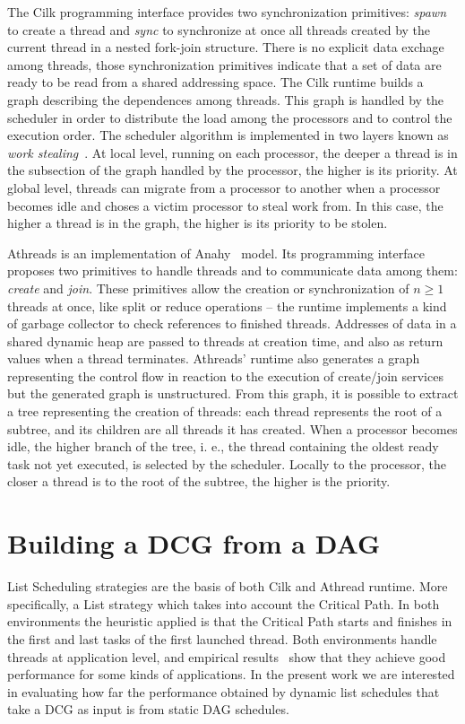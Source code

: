 \documentclass[twocolumn]{svjour3}
\begin{document}
The Cilk programming interface provides two synchronization primitives: {\em spawn} to create a thread and {\em sync} to synchronize at once all threads created by the current thread in a nested fork-join structure. There is no explicit data exchage among threads, those synchronization primitives indicate that a set of data are ready to be read from a shared addressing space. The Cilk runtime builds a graph describing the dependences among threads. This graph is handled by the scheduler in order to distribute the load among the processors and to control the execution order. The scheduler algorithm is implemented in two layers known as \emph{work stealing}~\cite{blumofe1994scheduling}. At local level, running on each processor, the deeper a thread is in the subsection of the graph handled by the processor, the higher is its priority. At global level, threads can migrate from a processor to another when a processor becomes idle and choses a victim processor to steal work from. In this case, the higher a thread is in the graph, the higher is its priority to be stolen.

Athreads is an implementation of Anahy~\cite{VecParLNCS} model. Its programming interface proposes two primitives to handle threads and to communicate data among them: {\em create} and {\em join}. These primitives allow the creation or synchronization of $n \geq 1$ threads at once, like split or reduce operations -- the runtime implements a kind of garbage collector to check references to finished threads. Addresses of data in a shared dynamic heap are passed to threads at creation time, and also as return values when a thread terminates. Athreads' runtime also generates a graph representing the control flow in reaction to the execution of create/join services but the generated graph is unstructured.  
From this graph, it is possible to extract a tree representing the creation of threads: each thread represents the root of a subtree, and its children are all threads it has created. When a processor becomes idle, the higher branch of the tree, i. e., the thread containing the oldest ready task not yet executed, is selected by the scheduler. Locally to the processor, the closer a thread is to the root of the subtree, the higher is the priority.

\section{Building a DCG from a DAG}\label{sec:DAG2DCG}

List Scheduling strategies are the basis of both Cilk and Athread runtime. More specifically, a List strategy which takes into account the Critical Path. In both environments the heuristic applied is that the Critical Path starts and finishes in the first and last tasks of the first launched thread. Both environments handle threads at application level, and empirical results~\cite{Cilk95,VecParLNCS} show that they achieve good performance for some kinds of applications. In the present work we are interested in evaluating how far the performance obtained by dynamic list schedules that take a DCG as input is from static DAG schedules.
\end{document}
